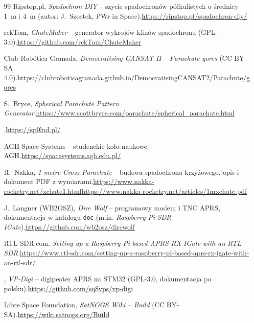 \begin{thebibliography}{99}
 Ripstop.pl, \emph{Spadochron DIY} -- szycie spadochronów półkulistych o średnicy \SI{1}{m} i \SI{4}{m} (autor: J.~Szostek, PWr in Space).\newline\url{https://ripstop.pl/spadochron-diy/}

 rckTom, \emph{ChuteMaker} -- generator wykrojów klinów spadochronu (GPL-3.0).\newline\url{https://github.com/rckTom/ChuteMaker}

 Club Robótica Granada, \emph{Democratising CANSAT II -- Parachute gores} (CC BY-SA 4.0).\newline\url{https://clubroboticagranada.github.io/DemocratisingCANSAT2/Parachute/gores}

 S.~Bryce, \emph{Spherical Parachute Pattern Generator}.\newline\url{https://www.scottbryce.com/parachute/spherical_parachute.html}

 .\newline\url{https://sp0lnd.pl/}

 AGH Space Systems -- studenckie koło naukowe AGH.\newline\url{https://spacesystems.agh.edu.pl/}

 R.~Nakka, \emph{1 metre Cross Parachute} -- budowa spadochronu krzyżowego, opis i dokument PDF z wymiarami.\newline\url{https://www.nakka-rocketry.net/xchute1.html}\newline\url{https://www.nakka-rocketry.net/articles/1mxchute.pdf}

 J.~Langner (WB2OSZ), \emph{Dire Wolf} -- programowy modem i TNC APRS, dokumentacja w katalogu \texttt{doc} (m.in. \emph{Raspberry Pi SDR IGate}).\newline\url{https://github.com/wb2osz/direwolf}

 RTL-SDR.com, \emph{Setting up a Raspberry Pi based APRS RX IGate with an RTL-SDR}.\newline\url{https://www.rtl-sdr.com/setting-up-a-raspberry-pi-based-aprs-rx-igate-with-an-rtl-sdr/}

 , \emph{VP-Digi} -- digipeater APRS na STM32 (GPL-3.0, dokumentacja po polsku).\newline\url{https://github.com/sq8vps/vp-digi}

 Libre Space Foundation, \emph{SatNOGS Wiki -- Build} (CC BY-SA).\newline\url{https://wiki.satnogs.org/Build}


\end{thebibliography}

